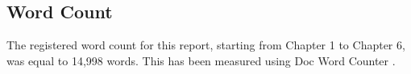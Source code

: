 \begin{appendices}
\clearpage


\section{Word Count}
\label{count}

The registered word count for this report, starting from Chapter 1 to Chapter 6, was equal to 14,998 words. This has been measured using Doc Word Counter \cite{count_w}.

\end{appendices}